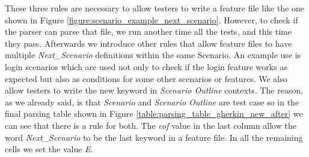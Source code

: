 These three rules are necessary to allow testers to write a feature file like the one shown in Figure \ref{figure:scenario_example_next_scenario}. However, to check if the parser can parse that file, we run another time all the tests, and this time they pass. Afterwards we introduce other rules that allow feature files to have multiple \textit{Next\_Scenario} definitions within the same Scenario. An example use is login scenarios which are used not only to check if the login feature works as expected but also as conditions for some other scenarios or features. We also allow testers to write the new keyword in \textit{Scenario Outline} contexts. The reason, as we already said, is that \textit{Scenario} and \textit{Scenario Outline} are test case so in the final parsing table shown in Figure \ref{table:parsing_table_gherkin_new_after} we can see that there is a rule for both. The \textit{eof} value in the last column allow the word \textit{Next\_Scenario} to be the last keyword in a feature file. In all the remaining cells we set the value \textit{E}.


